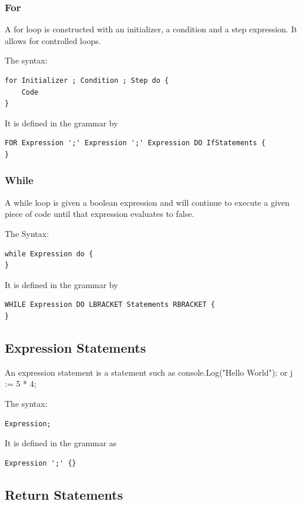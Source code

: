 \documentclass[]{final_report}
\begin{document}
\subsubsection{For}

A for loop is constructed with an initializer, a condition and a step expression. It allows for controlled loops.

The syntax: \begin{verbatim}
for Initializer ; Condition ; Step do {
	Code
}
\end{verbatim}

It is defined in the grammar by \begin{verbatim}
FOR Expression ';' Expression ';' Expression DO IfStatements {
}
\end{verbatim}

\subsubsection{While}

A while loop is given a boolean expression and will continue to execute a given piece of code until that expression evaluates to false.

The Syntax: \begin{verbatim}
while Expression do {
}
\end{verbatim}

It is defined in the grammar by \begin{verbatim}
WHILE Expression DO LBRACKET Statements RBRACKET {
} 
\end{verbatim}

\subsection{Expression Statements}

An expression statement is a statement such as console.Log("Hello World"); or j := 5 * 4;

The syntax: \begin{verbatim}Expression;\end{verbatim}

It is defined in the grammar as \begin{verbatim}Expression ';' {}\end{verbatim}

\subsection{Return Statements}
\end{document}
